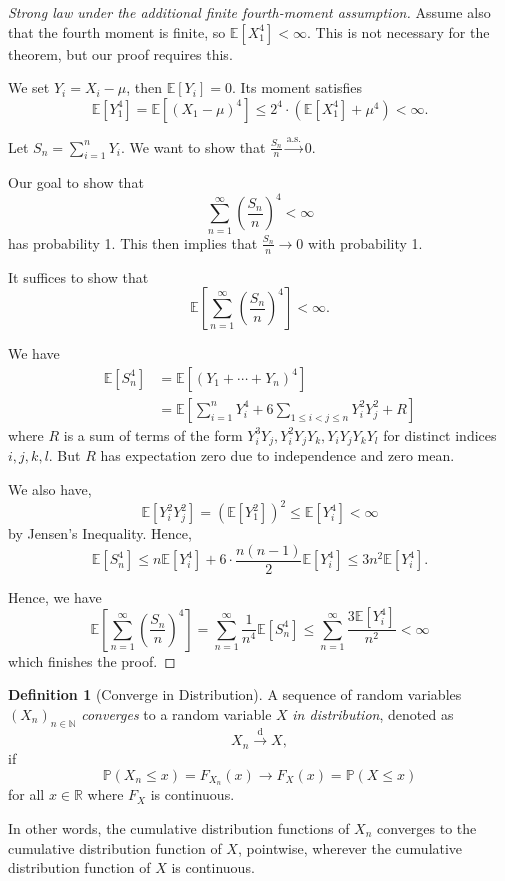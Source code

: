\documentclass[11pt]{article}
\numberwithin{equation}{section}
\theoremstyle{definition}
\newtheorem{definition}[theorem]{Definition}
\theoremstyle{remark}
\newcommand{\pqty}[1]{\left(#1\right)}
\newcommand{\bqty}[1]{\left[#1\right]}
\newcommand{\RR}{\mathbb R}
\newcommand{\NN}{\mathbb N}
\newcommand{\Prob}{\mathbb P}
\newcommand{\Expt}{\mathbb E}
\newcommand{\toDist}{\xrightarrow{\mathrm d}}
\newcommand{\toAlmostSure}{\xrightarrow{\mathrm{a.s.}}}
\begin{document}
\begin{proof}[Strong law under the additional finite fourth-moment assumption]\label{probability-proof-091}
    Assume also that the fourth moment is finite, so \(\Expt\bqty{X_1^4} < \infty\). This is not necessary for the theorem, but our proof requires this.

    We set \(Y_i = X_i - \mu\), then \(\Expt\bqty{Y_i} = 0\). Its moment satisfies
    \[
        \Expt\bqty{Y_1^4} = \Expt\bqty{\pqty{X_1 - \mu}^4} \leq 2^4 \cdot \pqty{\Expt\bqty{X_1^4} + \mu^4} < \infty.
    \]

    Let \(S_n = \sum_{i = 1}^{n} Y_i\). We want to show that \(\frac{S_n}{n} \toAlmostSure 0\).

    Our goal to show that
    \[
        \sum_{n = 1}^{\infty} \pqty{\frac{S_n}{n}}^4 < \infty
    \]
    has probability 1. This then implies that \(\frac{S_n}{n} \to 0\) with probability 1.

    It suffices to show that
    \[
        \Expt\bqty{\sum_{n = 1}^{\infty} \pqty{\frac{S_n}{n}}^4} < \infty.
    \]

    We have
    \begin{align*}
        \Expt\bqty{S_n^4} &= \Expt\bqty{\pqty{Y_1 + \cdots + Y_n}^4} \\
        &= \Expt\bqty{\sum_{i = 1}^{n} Y_i^4 + 6\sum_{1 \leq i < j \leq n} Y_i^2 Y_j^2 + R}
    \end{align*}
    where \(R\) is a sum of terms of the form \(Y_i^3 Y_j, Y_i^2 Y_j Y_k, Y_i Y_j Y_k Y_l\) for distinct indices \(i, j, k, l\). But \(R\) has expectation zero due to independence and zero mean.

    We also have,
    \[
        \Expt\bqty{Y_i^2 Y_j^2} = \pqty{\Expt\bqty{Y_1^2}}^2 \leq \Expt\bqty{Y_i^4} < \infty
    \]
    by Jensen's Inequality. Hence,
    \[
        \Expt\bqty{S_n^4} \leq n \Expt\bqty{Y_i^4} + 6 \cdot \frac{n \pqty{n - 1}}{2} \Expt\bqty{Y_i^4} \leq 3n^2 \Expt\bqty{Y_i^4}.
    \]

    Hence, we have
    \[
        \Expt\bqty{\sum_{n = 1}^{\infty} \pqty{\frac{S_n}{n}}^4} = \sum_{n = 1}^{\infty} \frac{1}{n^4} \Expt\bqty{S_n^4} \leq \sum_{n = 1}^{\infty} \frac{3 \Expt\bqty{Y_i^4}}{n^2} < \infty
    \]
    which finishes the proof.
\end{proof}

\begin{definition}[Converge in Distribution]\label{probability-definition-070}
    \label{probability-def:convergence-in-distribution}%
    A sequence of random variables \(\pqty{X_n}_{n \in \NN}\) \emph{converges} to a random variable \(X\) \emph{in distribution}, denoted as
    \[
        X_n \toDist X,
    \]
    if
    \[
        \Prob\pqty{X_n \leq x} = F_{X_n} \pqty{x} \to F_X \pqty{x} = \Prob\pqty{X \leq x}
    \]
    for all \(x \in \RR\) where \(F_X\) is continuous.
    
    In other words, the cumulative distribution functions of \(X_n\) converges to the cumulative distribution function of \(X\), pointwise, wherever the cumulative distribution function of \(X\) is continuous.
\end{definition}
\end{document}
